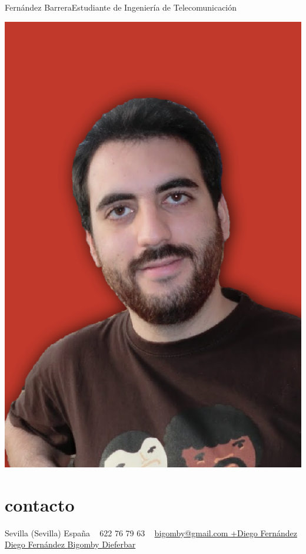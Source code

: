 \documentclass[hidelinks]{friggeri-cv} %
\begin{document}
 {Fernández Barrera}{Estudiante de Ingeniería de Telecomunicación} %


\begin{aside} %
\includegraphics[width=\textwidth]{images/photo.png}
\section{contacto}
Sevilla (Sevilla)
España
~
\faPhone \hspace{0.1em} 622 76 79 63
~
\href{mailto:bigomby@gmail.com}{bigomby@gmail.com \hspace{0.1em} \faEnvelope }
\href{http://bit.ly/1CHJo3X}{+Diego Fernández  \hspace{0.1em} \faGooglePlus}
\href{http://linkd.in/1wwkBZE}{Diego Fernández \hspace{0.1em} \faLinkedin}
\href{http://bit.ly/1ySLWLv}{Bigomby \hspace{0.1em} \faGithub}
\href{http://bit.ly/18gzdrO}{Dieferbar \hspace{0.1em} \faTwitter}

\end{aside}
\end{document}
